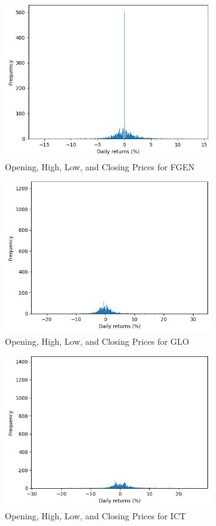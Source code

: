 \begin{figure}[ht]
    \centering
    \includegraphics[width=0.80\textwidth]{./assets/Appendices/B/Distribution_DailyReturns/FGEN.png}
    \caption{Opening, High, Low, and Closing Prices for FGEN}
    \label{fig:returndist_FGEN}
\end{figure}
\FloatBarrier

\begin{figure}[ht]
    \centering
    \includegraphics[width=0.80\textwidth]{./assets/Appendices/B/Distribution_DailyReturns/GLO.png}
    \caption{Opening, High, Low, and Closing Prices for GLO}
    \label{fig:returndist_GLO}
\end{figure}
\FloatBarrier

\begin{figure}[ht]
    \centering
    \includegraphics[width=0.80\textwidth]{./assets/Appendices/B/Distribution_DailyReturns/ICT.png}
    \caption{Opening, High, Low, and Closing Prices for ICT}
    \label{fig:returndist_ICT}
\end{figure}
\FloatBarrier

